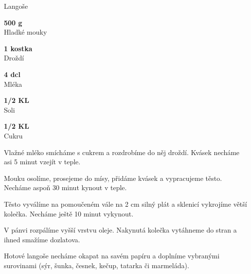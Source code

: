 \documentclass[11pt,a4paper]{article}
\begin{document}
\begin{recipe}[DarkGoldenrod]{Langoše}
    \begin{ingredients}
        \item \parbox[t]{\linewidth}{\raggedright \weight \textbf{500 g}\\ Hladké mouky}
        \item \parbox[t]{\linewidth}{\raggedright \piece \textbf{1 kostka}\\ Droždí}
        \item \parbox[t]{\linewidth}{\raggedright \liquid \textbf{4 dcl}\\ Mléka}
        \item \parbox[t]{\linewidth}{\raggedright \weight \textbf{1/2 KL}\\ Soli}
        \item \parbox[t]{\linewidth}{\raggedright \weight \textbf{1/2 KL}\\ Cukru}
    \end{ingredients}
    \begin{steps}
        \item Vlažné mléko smícháme s cukrem a rozdrobíme do něj droždí. Kvásek necháme asi 5 minut vzejít v teple.
        \item Mouku osolíme, prosejeme do mísy, přidáme kvásek a vypracujeme těsto. Necháme aspoň 30 minut kynout v teple.
        \item Těsto vyválíme na pomoučeném vále na 2 cm silný plát a sklenicí vykrojíme větší kolečka. Necháme ještě 10 minut vykynout.
        \item V pánvi rozpálíme vyšší vrstvu oleje. Nakynutá kolečka vytáhneme do stran a ihned smažíme dozlatova.
        \item Hotové langoše necháme okapat na savém papíru a doplníme vybranými surovinami (sýr, šunka, česnek, kečup, tatarka či marmeláda).
    \end{steps}
\end{recipe}
\end{document}
